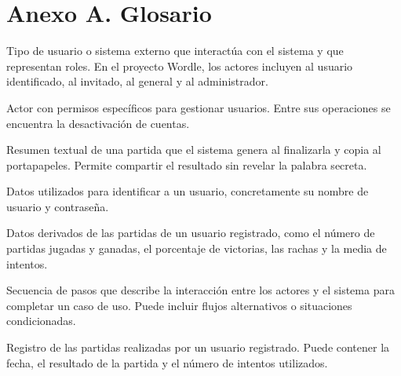 \documentclass[a4paper,11pt]{article}
\begin{document}
\clearpage


\clearpage
{}

\appendix
\section*{Anexo A. Glosario}
{}
\label{sec:glosario}

\begin{description}[style=nextline,leftmargin=3.5cm,labelwidth=3.2cm]

    \item[Actor]
    Tipo de usuario o sistema externo que interactúa con el sistema y que representan roles. En el proyecto Wordle, los actores incluyen al usuario identificado, al invitado, al general y al administrador.

    \item[Administrador]
    Actor con permisos específicos para gestionar usuarios. Entre sus operaciones se encuentra la desactivación de cuentas.

    \item[Compartible]
    Resumen textual de una partida que el sistema genera al finalizarla y copia al portapapeles. Permite compartir el resultado sin revelar la palabra secreta.

    \item[Credenciales]
    Datos utilizados para identificar a un usuario, concretamente su nombre de usuario y contraseña.

    \item[Estadísticas personales]
    Datos derivados de las partidas de un usuario registrado, como el número de partidas jugadas y ganadas, el porcentaje de victorias, las rachas y la media de intentos.

    \item[Flujo de eventos]
    Secuencia de pasos que describe la interacción entre los actores y el sistema para completar un caso de uso. Puede incluir flujos alternativos o situaciones condicionadas.

    \item[Historial de partidas]
    Registro de las partidas realizadas por un usuario registrado. Puede contener la fecha, el resultado de la partida y el número de intentos utilizados.


\end{description}
\end{document}
